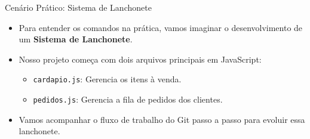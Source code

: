 \documentclass[aspectratio=169]{beamer}
\begin{document}
\begin{frame}[fragile]{Cenário Prático: Sistema de Lanchonete}
    \begin{itemize}
        \item Para entender os comandos na prática, vamos imaginar o desenvolvimento de um \textbf{Sistema de Lanchonete}.
        \item Nosso projeto começa com dois arquivos principais em JavaScript:
        \begin{itemize}
            \item \texttt{cardapio.js}: Gerencia os itens à venda.
            \item \texttt{pedidos.js}: Gerencia a fila de pedidos dos clientes.
        \end{itemize}
        \item Vamos acompanhar o fluxo de trabalho do Git passo a passo para evoluir essa lanchonete.
    \end{itemize}
    \vspace{0.3cm}
    \begin{center}
    \end{center}
\end{frame}
\end{document}
